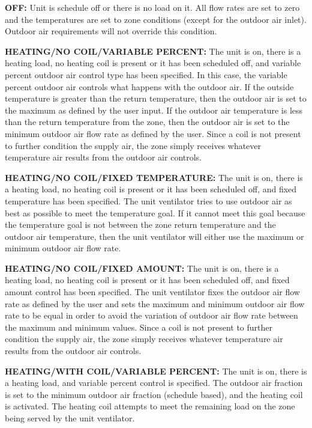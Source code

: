 \textbf{OFF:} Unit is schedule off or there is no load on it. All flow rates are set to zero and the temperatures are set to zone conditions (except for the outdoor air inlet). Outdoor air requirements will not override this condition.

\textbf{HEATING/NO COIL/VARIABLE PERCENT:} The unit is on, there is a heating load, no heating coil is present or it has been scheduled off, and variable percent outdoor air control type has been specified. In this case, the variable percent outdoor air controls what happens with the outdoor air. If the outside temperature is greater than the return temperature, then the outdoor air is set to the maximum as defined by the user input. If the outdoor air temperature is less than the return temperature from the zone, then the outdoor air is set to the minimum outdoor air flow rate as defined by the user. Since a coil is not present to further condition the supply air, the zone simply receives whatever temperature air results from the outdoor air controls.

\textbf{HEATING/NO COIL/FIXED TEMPERATURE:} The unit is on, there is a heating load, no heating coil is present or it has been scheduled off, and fixed temperature has been specified. The unit ventilator tries to use outdoor air as best as possible to meet the temperature goal. If it cannot meet this goal because the temperature goal is not between the zone return temperature and the outdoor air temperature, then the unit ventilator will either use the maximum or minimum outdoor air flow rate.

\textbf{HEATING/NO COIL/FIXED AMOUNT:} The unit is on, there is a heating load, no heating coil is present or it has been scheduled off, and fixed amount control has been specified. The unit ventilator fixes the outdoor air flow rate as defined by the user and sets the maximum and minimum outdoor air flow rate to be equal in order to avoid the variation of outdoor air flow rate between the maximum and minimum values. Since a coil is not present to further condition the supply air, the zone simply receives whatever temperature air results from the outdoor air controls.

\textbf{HEATING/WITH COIL/VARIABLE PERCENT:} The unit is on, there is a heating load, and variable percent control is specified. The outdoor air fraction is set to the minimum outdoor air fraction (schedule based), and the heating coil is activated. The heating coil attempts to meet the remaining load on the zone being served by the unit ventilator.

